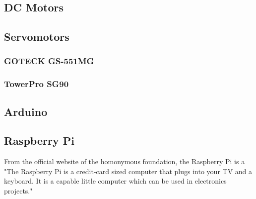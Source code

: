 \subsection{DC Motors}



\subsection{Servomotors}
	\subsubsection{GOTECK GS-551MG}



	\subsubsection{TowerPro SG90}



\subsection{Arduino}



\subsection{Raspberry Pi}

From the official website of the homonymous foundation, the Raspberry Pi is a "The Raspberry Pi is a credit-card sized computer that plugs into your TV and a keyboard. It is a capable little computer which can be used in electronics projects."\\

